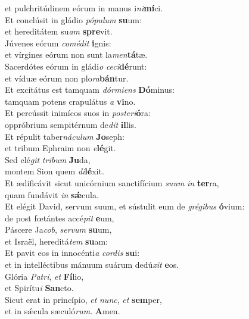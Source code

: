 \oddverse et pulchritúdinem eórum in manus i\textit{ni}\textbf{mí}ci.\\
\evenverse Et conclúsit in gládio \textit{pó}\textit{pu}\textit{lum} \textbf{su}um:~\*\\
\evenverse et hereditátem su\textit{am} \textbf{spre}vit.\\
\oddverse Júvenes eórum \textit{co}\textit{mé}\textit{dit} \textbf{i}gnis:~\*\\
\oddverse et vírgines eórum non sunt la\textit{men}\textbf{tá}tæ.\\
\evenverse Sacerdótes eórum in gládi\textit{o} \textit{ce}\textit{ci}\textbf{dé}runt:~\*\\
\evenverse et víduæ eórum non plo\textit{ra}\textbf{bán}tur.\\
\oddverse Et excitátus est tamquam \textit{dór}\textit{mi}\textit{ens} \textbf{Dó}minus:~\*\\
\oddverse tamquam potens crapulátus \textit{a} \textbf{vi}no.\\
\evenverse Et percússit inimícos suos in \textit{po}\textit{ste}\textit{ri}\textbf{ó}ra:~\*\\
\evenverse oppróbrium sempitérnum de\textit{dit} \textbf{il}lis.\\
\oddverse Et répulit taber\textit{ná}\textit{cu}\textit{lum} \textbf{Jo}seph:~\*\\
\oddverse et tribum Ephraim non \textit{e}\textbf{lé}git.\\
\evenverse Sed elé\textit{git} \textit{tri}\textit{bum} \textbf{Ju}da,~\*\\
\evenverse montem Sion quem \textit{di}\textbf{lé}xit.\\
\oddverse Et ædificávit sicut unicórnium sanctifícium \textit{su}\textit{um} \textit{in} \textbf{ter}ra,~\*\\
\oddverse quam fundávit \textit{in} \textbf{sǽ}cula.\\
\evenverse Et elégit David, servum suum, et sústulit eum de \textit{gré}\textit{gi}\textit{bus} \textbf{ó}vium:~\*\\
\evenverse de post fœtántes accé\textit{pit} \textbf{e}um,\\
\oddverse Páscere Ja\textit{cob}, \textit{ser}\textit{vum} \textbf{su}um,~\*\\
\oddverse et Israël, hereditá\textit{tem} \textbf{su}am:\\
\evenverse Et pavit eos in innocénti\textit{a} \textit{cor}\textit{dis} \textbf{su}i:~\*\\
\evenverse et in intelléctibus mánuum suárum dedú\textit{xit} \textbf{e}os.\\
\oddverse Glória \textit{Pa}\textit{tri}, \textit{et} \textbf{Fí}lio,~\*\\
\oddverse et Spirítu\textit{i} \textbf{San}cto.\\
\evenverse Sicut erat in princípio, \textit{et} \textit{nunc}, \textit{et} \textbf{sem}per,~\*\\
\evenverse et in sǽcula sæculó\textit{rum}. \textbf{A}men.\\
